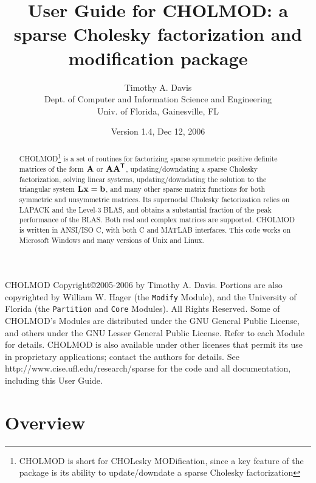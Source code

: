 \documentclass[11pt]{article}
\newcommand{\m}[1]{{\bf{#1}}}       %
\newcommand{\tr}{^{\sf T}}          %
\begin{document}
\author{Timothy A. Davis \\
Dept. of Computer and Information Science and Engineering \\
Univ. of Florida, Gainesville, FL}
\title{User Guide for CHOLMOD: a sparse Cholesky factorization and
modification package}
\date{Version 1.4, Dec 12, 2006}
\maketitle

\begin{abstract}
    CHOLMOD\footnote{CHOLMOD is short for CHOLesky MODification,
    since a key feature of the package is its ability to update/downdate
    a sparse Cholesky factorization}
    is a set of routines for factorizing sparse symmetric positive
    definite matrices of the form $\m{A}$ or $\m{AA}\tr$, updating/downdating
    a sparse Cholesky factorization, solving linear systems, updating/downdating
    the solution to the triangular system $\m{Lx}=\m{b}$, and many other sparse
    matrix functions for both symmetric and unsymmetric matrices.
    Its supernodal Cholesky factorization
    relies on LAPACK and the Level-3 BLAS, and obtains a substantial fraction
    of the peak performance of the BLAS.  Both real and complex matrices
    are supported.  CHOLMOD is written in ANSI/ISO C, with both
    C and MATLAB interfaces.  This code works on Microsoft Windows and many versions
    of Unix and Linux.
\end{abstract}

CHOLMOD Copyright\copyright 2005-2006 by Timothy A. Davis.  Portions are also
copyrighted by William W. Hager (the {\tt Modify} Module),
and the University of Florida (the {\tt Partition} and {\tt Core} Modules).
All Rights Reserved.  Some of CHOLMOD's Modules are distributed under the GNU
General Public License, and others under the GNU Lesser General Public License.
Refer to each Module for details.
CHOLMOD is also available under other licenses that permit its use in
proprietary applications; contact the authors for details.
See http://www.cise.ufl.edu/research/sparse for the code and all documentation,
including this User Guide.

\newpage
\tableofcontents

\newpage \section{Overview}
\end{document}
